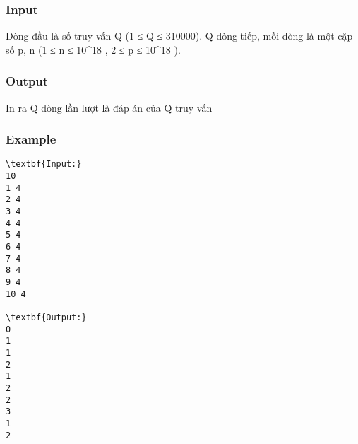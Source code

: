 \subsubsection{   Input  }

   Dòng đầu là số truy vấn Q (1 ≤ Q ≤ 310000). Q dòng tiếp, mỗi dòng là một cặp số p, n (1 ≤ n ≤ 10\textasciicircum18 , 2 ≤ p ≤ 10\textasciicircum18 ).  

\subsubsection{   Output  }

   In ra Q dòng lần lượt là đáp án của Q truy vấn  

\subsubsection{   Example  }
\begin{verbatim}
\textbf{Input:}
10
1 4
2 4
3 4
4 4
5 4
6 4
7 4
8 4
9 4
10 4

\textbf{Output:}
0
1
1
2
1
2
2
3
1
2
\end{verbatim}